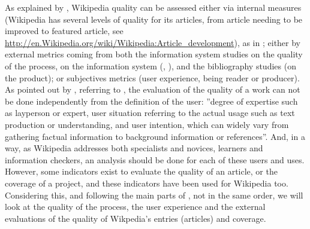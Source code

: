 As explained by \citet[p. 3]{Hammwohner07}, Wikipedia quality can
be assessed either via internal measures (Wikipedia has several levels
of quality for its articles, from article needing to be improved to
featured article, see \url{http://en.Wikipedia.org/wiki/Wikipedia:Article_development}),
as in \citet{Poderi09,CarilloOkoli11}; either by external metrics
coming from both the information system studies on the quality of
the process, on the information system (\citealp{Stviliaetal08},
\citealp{WohnerPeters09}), and the bibliography studies (on the product);
or subjectives metrics (user experience, being reader or producer).
As pointed out by \citet[p. 6-7]{LewandowskiSpree11}, referring to
\citet{Geeb98}, the evaluation of the quality of a work can not be
done independently from the definition of the user: ''degree of expertise
such as layperson or expert, user situation referring to the actual
usage such as text production or understanding, and user intention,
which can widely vary from gathering factual information to background
information or references''. And, in a way, as Wikipedia addresses
both specialists and novices, learners and information checkers, an
analysis should be done for each of these users and uses. However,
some indicators exist to evaluate the quality of an article, or the
coverage of a project, and these indicators have been used for Wikipedia
too. Considering this, and following the main parts of \citet{LewandowskiSpree11},
not in the same order, we will look at the quality of the process,
the user experience and the external evaluations of the quality of
Wikpedia's entries (articles) and coverage.
